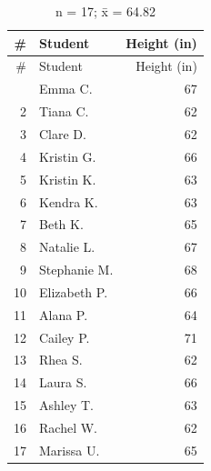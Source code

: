 \documentclass[
  letterpaper,
  DIV=11,
  numbers=noendperiod]{scrreprt}
\begin{document}
\begin{longtable}[]{@{}rlr@{}}
\caption{n = 17; x̄ = 64.82}\tabularnewline
\toprule\noalign{}
\# & Student & Height (in) \\
\midrule\noalign{}
\endfirsthead
\toprule\noalign{}
\# & Student & Height (in) \\
\midrule\noalign{}
\endhead
\bottomrule\noalign{}
\endlastfoot
1 & Emma C. & 67 \\
2 & Tiana C. & 62 \\
3 & Clare D. & 62 \\
4 & Kristin G. & 66 \\
5 & Kristin K. & 63 \\
6 & Kendra K. & 63 \\
7 & Beth K. & 65 \\
8 & Natalie L. & 67 \\
9 & Stephanie M. & 68 \\
10 & Elizabeth P. & 66 \\
11 & Alana P. & 64 \\
12 & Cailey P. & 71 \\
13 & Rhea S. & 62 \\
14 & Laura S. & 66 \\
15 & Ashley T. & 63 \\
16 & Rachel W. & 62 \\
17 & Marissa U. & 65 \\
\end{longtable}
\end{document}
